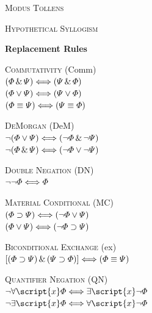 \textsc{Modus Tollens}

\begin{ndproof}
	 
\end{ndproof}

\textsc{Hypothetical Syllogism}

\begin{ndproof}
\end{ndproof}



{\large \bf Replacement Rules}


\textsc{Commutativity} (Comm)\\
$(\varPhi{}\,\&\,\varPsi{}) \Longleftrightarrow (\varPsi{}\,\&\,\varPhi{})$\\
$(\varPhi{}\vee\varPsi{}) \Longleftrightarrow (\varPsi{}\vee\varPhi{})$\\
$(\varPhi{}\equiv\varPsi{}) \Longleftrightarrow (\varPsi{}\equiv\varPhi{})$

\textsc{DeMorgan} (DeM)\\
$\neg(\varPhi{}\vee\varPsi{}) \Longleftrightarrow (\neg\varPhi{}\,\&\,\neg\varPsi{})$\\
$\neg(\varPhi{}\,\&\,\varPsi{}) \Longleftrightarrow (\neg\varPhi{}\vee\neg\varPsi{})$

\textsc{Double Negation} (DN)\\
$\neg\neg\varPhi{} \Longleftrightarrow \varPhi{}$

\textsc{Material Conditional} (MC)\\
$(\varPhi{}\supset\varPsi{}) \Longleftrightarrow (\neg\varPhi{}\vee\varPsi{})$\\
$(\varPhi{}\vee\varPsi{}) \Longleftrightarrow (\neg\varPhi{}\supset\varPsi{})$

\textsc{Biconditional Exchange} ({\eiff}{ex})\\
$[(\varPhi{}\supset\varPsi{})\,\&\,(\varPsi{}\supset\varPhi{})] \Longleftrightarrow (\varPhi{}\equiv\varPsi{})$

\textsc{Quantifier Negation} (QN)\\
$\enot\forall\script{x}\metaA{} \Longleftrightarrow \exists\script{x}\enot\metaA{}$\\
$\enot\exists\script{x}\metaA{} \Longleftrightarrow \forall\script{x}\enot\metaA{}$
